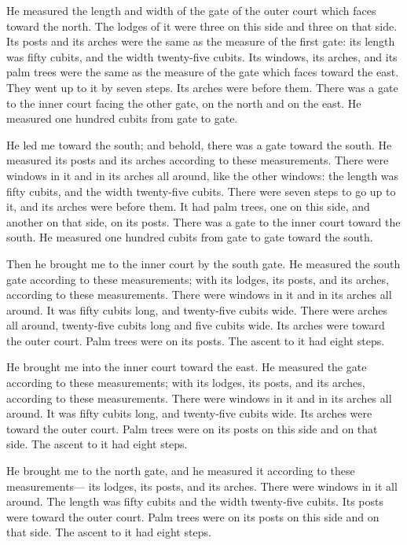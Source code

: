  He measured the length and width of the gate of the
outer court which faces toward the north.  The lodges of
it were three on this side and three on that side. Its posts and its
arches were the same as the measure of the first gate: its length was
fifty cubits, and the width twenty-five cubits.  Its
windows, its arches, and its palm trees were the same as the measure of
the gate which faces toward the east. They went up to it by seven steps.
Its arches were before them.  There was a gate to the
inner court facing the other gate, on the north and on the east. He
measured one hundred cubits from gate to gate.

 He led me toward the south; and behold, there was a gate
toward the south. He measured its posts and its arches according to
these measurements.  There were windows in it and in its
arches all around, like the other windows: the length was fifty cubits,
and the width twenty-five cubits.  There were seven steps
to go up to it, and its arches were before them. It had palm trees, one
on this side, and another on that side, on its posts. 
There was a gate to the inner court toward the south. He measured one
hundred cubits from gate to gate toward the south.

 Then he brought me to the inner court by the south gate.
He measured the south gate according to these measurements;
 with its lodges, its posts, and its arches, according to
these measurements. There were windows in it and in its arches all
around. It was fifty cubits long, and twenty-five cubits wide.
 There were arches all around, twenty-five cubits long
and five cubits wide.  Its arches were toward the outer
court. Palm trees were on its posts. The ascent to it had eight steps.

 He brought me into the inner court toward the east. He
measured the gate according to these measurements;  with
its lodges, its posts, and its arches, according to these measurements.
There were windows in it and in its arches all around. It was fifty
cubits long, and twenty-five cubits wide.  Its arches
were toward the outer court. Palm trees were on its posts on this side
and on that side. The ascent to it had eight steps.

 He brought me to the north gate, and he measured it
according to these measurements---  its lodges, its
posts, and its arches. There were windows in it all around. The length
was fifty cubits and the width twenty-five cubits.  Its
posts were toward the outer court. Palm trees were on its posts on this
side and on that side. The ascent to it had eight steps.

